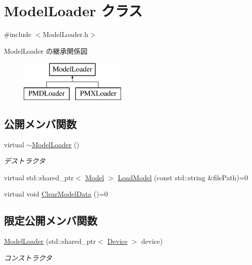 \hypertarget{class_model_loader}{}\section{Model\+Loader クラス}
\label{class_model_loader}


{\ttfamily \#include $<$Model\+Loader.\+h$>$}

Model\+Loader の継承関係図\begin{figure}[H]
\begin{center}
\leavevmode
\includegraphics[height=2.000000cm]{class_model_loader}
\end{center}
\end{figure}
\subsection*{公開メンバ関数}
\begin{DoxyCompactItemize}
\item 
virtual \mbox{\hyperlink{class_model_loader_a4015291af96be2ea657577bdf4fb29f4}{$\sim$\+Model\+Loader}} ()
\begin{DoxyCompactList}\small\item\em デストラクタ \end{DoxyCompactList}\item 
virtual std\+::shared\+\_\+ptr$<$ \mbox{\hyperlink{class_model}{Model}} $>$ \mbox{\hyperlink{class_model_loader_a8e2157daa8d364c36fd26922f04adcb0}{Load\+Model}} (const std\+::string \&file\+Path)=0
\item 
virtual void \mbox{\hyperlink{class_model_loader_a6662edd78b17eeead09e822e19fc1799}{Clear\+Model\+Data}} ()=0
\end{DoxyCompactItemize}
\subsection*{限定公開メンバ関数}
\begin{DoxyCompactItemize}
\item 
\mbox{\hyperlink{class_model_loader_a0e7c5aa28d4772857b1bab0a9ca7428f}{Model\+Loader}} (std\+::shared\+\_\+ptr$<$ \mbox{\hyperlink{class_device}{Device}} $>$ device)
\begin{DoxyCompactList}\small\item\em コンストラクタ \end{DoxyCompactList}\end{DoxyCompactItemize}

